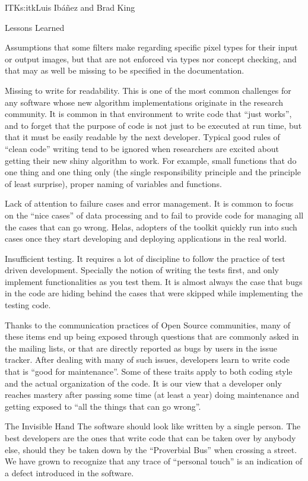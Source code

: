 \begin{aosachapter}{ITK}{s:itk}{Luis Ib\'{a}\~{n}ez and Brad King}
\begin{aosasect1}{Lessons Learned}
\begin{aosaitemize}
\item Assumptions that some filters make regarding specific pixel types for
their input or output images, but that are not enforced via types nor concept
checking, and that may as well be missing to be specified in the documentation.
\item Missing to write for readability. This is one of the most common
challenges for any software whose new algorithm implementations originate in
the research community. It is common in that environment to write code that
``just works'', and to forget that the purpose of code is not just to be
executed at run time, but that it must be easily readable by the next
developer. Typical good rules of ``clean code'' writing tend to be ignored when
researchers are excited about getting their new shiny algorithm to work. For
example, small functions that do one thing and one thing only (the single
responsibility principle and the principle of least surprise), proper naming of
variables and functions.
\item Lack of attention to failure cases and error management. It is common to
focus on the ``nice cases'' of data processing and to fail to provide code for
managing all the cases that can go wrong. Helas, adopters of the toolkit
quickly run into such cases once they start developing and deploying
applications in the real world.
\item Insufficient testing. It requires a lot of discipline to follow the
practice of test driven development. Specially the notion of writing the tests
first, and only implement functionalities as you test them. It is almost always
the case that bugs in the code are hiding behind the cases that were skipped
while implementing the testing code.
\end{aosaitemize}

Thanks to the communication practices of Open Source communities, many of these
items end up being exposed through questions that are commonly asked in the
mailing lists, or that are directly reported as bugs by users  in the issue
tracker. After dealing with many of such issues, developers learn to write code
that is ``good for maintenance''. Some of these traits apply to both coding
style and the actual organization of the code. It is our view that a developer
only reaches mastery after passing some time (at least a year) doing maintenance
and getting exposed to ``all the things that can go wrong''.

\begin{aosasect2}{The Invisible Hand}
The software should look like written by a single person. The best developers
are the ones that write code that can be taken over by anybody else, should
they be taken down by the ``Proverbial Bus'' when crossing a street. We have
grown to recognize that any trace of ``personal touch'' is an indication of a
defect introduced in the software.


\end{aosasect2}
\end{aosasect1}
\end{aosachapter}
